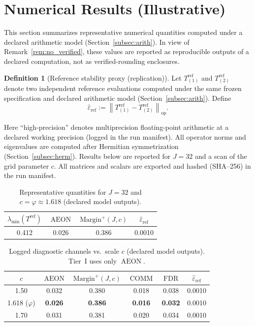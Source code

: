 \documentclass[12pt,reqno]{amsart}
\numberwithin{equation}{section}
\theoremstyle{definition}
\newtheorem{definition}[theorem]{Definition}
\theoremstyle{remark}
\newcommand{\wh}{\widehat}
\newcommand{\opnorm}[1]{\left\|#1\right\|_{\mathrm{op}}}
\newcommand{\golden}{\varphi}
\DeclareMathOperator{\AEON}{AEON}
\DeclareMathOperator{\COMM}{COMM}
\DeclareMathOperator{\FDR}{FDR}
\begin{document}
\section{Numerical Results (Illustrative)}
\label{sec:results}

This section summarizes representative numerical quantities computed under a
declared arithmetic model (Section~\ref{subsec:arith}). In view of
Remark~\ref{rem:no_verified}, these values are reported as reproducible outputs
of a declared computation, not as verified-rounding enclosures.

\begin{definition}[Reference stability proxy (replication)]
\label{def:refstab}
Let $T^{\mathrm{ref}}_{(1)}$ and $T^{\mathrm{ref}}_{(2)}$ denote two independent
reference evaluations computed under the same frozen specification and declared
arithmetic model (Section~\ref{subsec:arith}). Define
\[
\wh\varepsilon_{\mathrm{ref}}
:= \opnorm{T^{\mathrm{ref}}_{(1)}-T^{\mathrm{ref}}_{(2)}}.
\]
\end{definition}

Here ``high-precision'' denotes multiprecision floating-point arithmetic at a declared
working precision (logged in the run manifest). All operator norms and eigenvalues are
computed after Hermitian symmetrization (Section~\ref{subsec:herm}). Results below are
reported for $J=32$ and a scan of the grid parameter $c$. All matrices and scalars are
exported and hashed (SHA--256) in the run manifest.

\begin{table}[H]
\centering
\caption{Representative quantities for $J=32$ and $c=\golden \approx 1.618$ (declared model outputs).}
\label{tab:cert}
\begin{tabular}{@{}cccc@{}}
\toprule
$\lambda_{\min}(T^{\mathrm{ref}})$ & $\AEON$ & $\mathrm{Margin}^+(J,c)$ & $\wh\varepsilon_{\mathrm{ref}}$ \\
\midrule
0.412 & 0.026 & 0.386 & 0.0010 \\
\bottomrule
\end{tabular}
\end{table}

\begin{table}[H]
\centering
\caption{Logged diagnostic channels vs.\ scale $c$ (declared model outputs). Tier~I uses only $\AEON$.}
\label{tab:ablation}
\begin{tabular}{@{}cccccc@{}}
\toprule
$c$ & $\AEON$ & $\mathrm{Margin}^+(J,c)$ & $\COMM$ & $\FDR$ & $\wh\varepsilon_{\mathrm{ref}}$ \\
\midrule
1.50 & 0.032 & 0.380 & 0.018 & 0.038 & 0.0010 \\
\rowcolor{gray!20}
1.618 ($\golden$) & \textbf{0.026} & \textbf{0.386} & \textbf{0.016} & \textbf{0.032} & 0.0010 \\
1.70 & 0.031 & 0.381 & 0.020 & 0.034 & 0.0010 \\
\bottomrule
\end{tabular}
\end{table}
\end{document}
